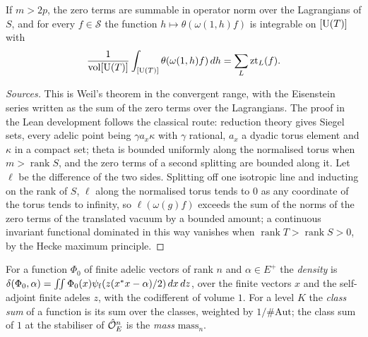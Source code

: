 \begin{theorem}\label{thm:B-siegel-weil}
If $m>2p$, the zero terms are summable in operator norm over the Lagrangians of $S$, and for every $f\in\mathcal S$ the function $h\mapsto\theta(\omega(1,h)f)$ is integrable on $[\operatorname{U}(T)]$ with
\[
  \frac1{\operatorname{vol}[\operatorname{U}(T)]}\int_{[\operatorname{U}(T)]}\theta(\omega(1,h)f)\,dh=\sum_L\mathrm{zt}_L(f).
\]
\end{theorem}

\begin{proof}[Sources]
This is Weil's theorem \cite[\S52, Thm.~5]{Weil1965} in the convergent range, with the Eisenstein series written as the sum of the zero terms over the Lagrangians. The proof in the Lean development
follows the classical route: reduction theory gives Siegel sets, every adelic point being $\gamma a_x\kappa$ with $\gamma$ rational, $a_x$ a dyadic torus element and $\kappa$ in a compact set; theta is
bounded uniformly along the normalised torus when $m>\operatorname{rank}S$, and the zero terms of a second splitting are bounded along it. Let $\ell$ be the difference of the two sides. Splitting off
one isotropic line and inducting on the rank of $S$, $\ell$ along the normalised torus tends to $0$ as any coordinate of the torus tends to infinity, so $\ell(\omega(g)f)$ exceeds the sum of the norms of
the zero terms of the translated vacuum by a bounded amount; a continuous invariant functional dominated in this way vanishes when $\operatorname{rank}T>\operatorname{rank}S>0$, by the Hecke maximum principle.
\end{proof}

For a function $\Phi_0$ of finite adelic vectors of rank $n$ and $\alpha\in E^+$ the \emph{density} is $\delta(\Phi_0,\alpha)=\iint\Phi_0(x)\psi_{\rm f}(z(x^*x-\alpha)/2)\,dx\,dz$, over the finite vectors $x$ and the
self-adjoint finite adeles $z$, with the codifferent of volume $1$. For a level $K$ the \emph{class sum} of a function is its sum over the classes, weighted by $1/\#\mathrm{Aut}$; the class sum of $1$ at the
stabiliser of $\hat{\mathcal{O}}_E^n$ is the \emph{mass} $\mathrm{mass}_n$.

